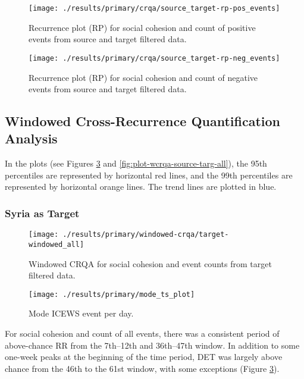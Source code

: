 \documentclass[english,man]{apa6}
\begin{document}
\begin{figure}
\texttt{[image: ./results/primary/crqa/source\_target-rp-pos\_events]} \caption{Recurrence plot (RP) for social cohesion and count of positive events from source and target filtered data.}\label{fig:plot-rp-source-targ-pos}
\end{figure}

\begin{figure}
\texttt{[image: ./results/primary/crqa/source\_target-rp-neg\_events]} \caption{Recurrence plot (RP) for social cohesion and count of negative events from source and target filtered data.}\label{fig:plot-rp-source-targ-neg}
\end{figure}

\hypertarget{windowed-cross-recurrence-quantification-analysis-1}{%
\subsection{Windowed Cross-Recurrence Quantification Analysis}\label{windowed-cross-recurrence-quantification-analysis-1}}

In the plots (see Figures \ref{fig:plot-wcrqa-targ-all} and
\ref{fig:plot-wcrqa-source-targ-all}), the 95th percentiles are represented
by horizontal red lines, and the 99th percentiles are
represented by horizontal orange lines. The trend lines are plotted in blue.

\hypertarget{syria-as-target-1}{%
\subsubsection{Syria as Target}\label{syria-as-target-1}}

\begin{figure}
\texttt{[image: ./results/primary/windowed-crqa/target-windowed\_all]} \caption{Windowed CRQA for social cohesion and event counts from target filtered data.}\label{fig:plot-wcrqa-targ-all}
\end{figure}

\begin{figure}
\texttt{[image: ./results/primary/mode\_ts\_plot]} \caption{Mode ICEWS event per day.}\label{fig:plot-mode-event}
\end{figure}

For social cohesion and count of all events, there was a consistent period
of above-chance RR from the 7th--12th and 36th--47th window. In addition
to some one-week peaks at the beginning of the time period, DET was largely
above chance from the 46th to the 61st window, with some exceptions
(Figure \ref{fig:plot-wcrqa-targ-all}).
\end{document}

